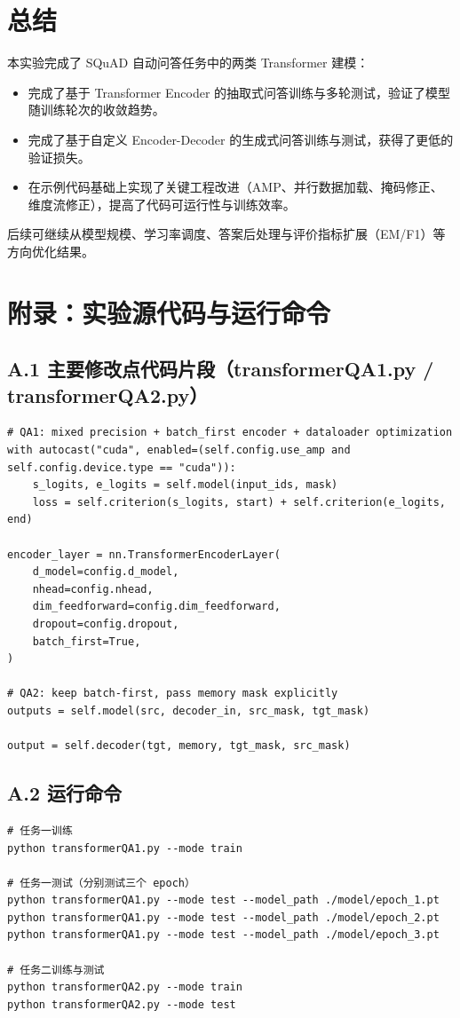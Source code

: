 \documentclass[12pt,a4paper]{ctexart}
\begin{document}
\section{总结}
本实验完成了 SQuAD 自动问答任务中的两类 Transformer 建模：
\begin{itemize}
  \item 完成了基于 Transformer Encoder 的抽取式问答训练与多轮测试，验证了模型随训练轮次的收敛趋势。
  \item 完成了基于自定义 Encoder-Decoder 的生成式问答训练与测试，获得了更低的验证损失。
  \item 在示例代码基础上实现了关键工程改进（AMP、并行数据加载、掩码修正、维度流修正），提高了代码可运行性与训练效率。
\end{itemize}

后续可继续从模型规模、学习率调度、答案后处理与评价指标扩展（EM/F1）等方向优化结果。

\section*{附录：实验源代码与运行命令}
\subsection*{A.1 主要修改点代码片段（transformerQA1.py / transformerQA2.py）}
\begin{lstlisting}
# QA1: mixed precision + batch_first encoder + dataloader optimization
with autocast("cuda", enabled=(self.config.use_amp and self.config.device.type == "cuda")):
    s_logits, e_logits = self.model(input_ids, mask)
    loss = self.criterion(s_logits, start) + self.criterion(e_logits, end)

encoder_layer = nn.TransformerEncoderLayer(
    d_model=config.d_model,
    nhead=config.nhead,
    dim_feedforward=config.dim_feedforward,
    dropout=config.dropout,
    batch_first=True,
)

# QA2: keep batch-first, pass memory mask explicitly
outputs = self.model(src, decoder_in, src_mask, tgt_mask)

output = self.decoder(tgt, memory, tgt_mask, src_mask)
\end{lstlisting}

\subsection*{A.2 运行命令}
\begin{verbatim}
# 任务一训练
python transformerQA1.py --mode train

# 任务一测试（分别测试三个 epoch）
python transformerQA1.py --mode test --model_path ./model/epoch_1.pt
python transformerQA1.py --mode test --model_path ./model/epoch_2.pt
python transformerQA1.py --mode test --model_path ./model/epoch_3.pt

# 任务二训练与测试
python transformerQA2.py --mode train
python transformerQA2.py --mode test
\end{verbatim}
\end{document}
